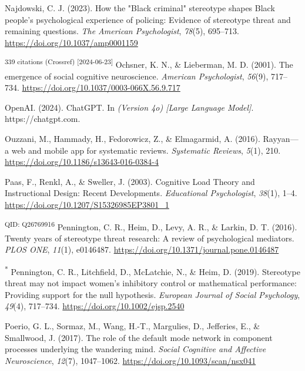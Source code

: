 \documentclass[
  stu, a4paper,floatsintext]{apa7}
\newlength{\cslhangindent}
\newenvironment{CSLReferences}[2] %
 {\begin{list}{}{%
  \setlength{\itemindent}{0pt}
  \setlength{\leftmargin}{0pt}
  \setlength{\parsep}{0pt}
  \ifodd #1
   \setlength{\leftmargin}{\cslhangindent}
   \setlength{\itemindent}{-1\cslhangindent}
  \fi
  \setlength{\itemsep}{#2\baselineskip}}}
 {\end{list}}
\begin{document}
\begin{CSLReferences}{1}{0}
Najdowski, C. J. (2023). How the "{Black} criminal" stereotype shapes {Black} people's psychological experience of policing: {Evidence} of stereotype threat and remaining questions. \emph{The American Psychologist}, \emph{78}(5), 695--713. \url{https://doi.org/10.1037/amp0001159}

\textsuperscript{339 citations (Crossref) {[}2024-06-23{]}} Ochsner, K. N., \& Lieberman, M. D. (2001). The emergence of social cognitive neuroscience. \emph{American Psychologist}, \emph{56}(9), 717--734. \url{https://doi.org/10.1037/0003-066X.56.9.717}

OpenAI. (2024). {ChatGPT}. In \emph{(Version 4o) {[}Large Language Model{]}}. https://chatgpt.com.

Ouzzani, M., Hammady, H., Fedorowicz, Z., \& Elmagarmid, A. (2016). Rayyan---a web and mobile app for systematic reviews. \emph{Systematic Reviews}, \emph{5}(1), 210. \url{https://doi.org/10.1186/s13643-016-0384-4}

Paas, F., Renkl, A., \& Sweller, J. (2003). Cognitive {Load Theory} and {Instructional Design}: {Recent Developments}. \emph{Educational Psychologist}, \emph{38}(1), 1--4. \url{https://doi.org/10.1207/S15326985EP3801_1}

\textsuperscript{QID: Q26769916} Pennington, C. R., Heim, D., Levy, A. R., \& Larkin, D. T. (2016). Twenty years of stereotype threat research: A review of psychological mediators. \emph{PLOS ONE}, \emph{11}(1), e0146487. \url{https://doi.org/10.1371/journal.pone.0146487}

\textsuperscript{*} Pennington, C. R., Litchfield, D., McLatchie, N., \& Heim, D. (2019). Stereotype threat may not impact women's inhibitory control or mathematical performance: {Providing} support for the null hypothesis. \emph{European Journal of Social Psychology}, \emph{49}(4), 717--734. \url{https://doi.org/10.1002/ejsp.2540}

Poerio, G. L., Sormaz, M., Wang, H.-T., Margulies, D., Jefferies, E., \& Smallwood, J. (2017). The role of the default mode network in component processes underlying the wandering mind. \emph{Social Cognitive and Affective Neuroscience}, \emph{12}(7), 1047--1062. \url{https://doi.org/10.1093/scan/nsx041}


\end{CSLReferences}
\end{document}
